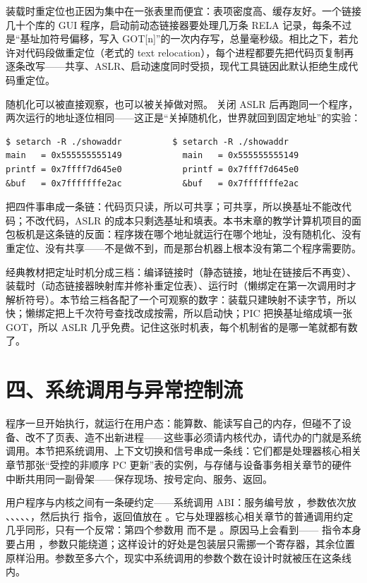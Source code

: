 装载时重定位也正因为集中在一张表里而便宜：表项密度高、缓存友好。一个链接几十个库的 GUI 程序，启动前动态链接器要处理几万条 RELA 记录，每条不过是“基址加符号偏移，写入 GOT[n]”的一次内存写，总量毫秒级。相比之下，若允许对代码段做重定位（老式的 text relocation），每个进程都要先把代码页复制再逐条改写——共享、ASLR、启动速度同时受损，现代工具链因此默认拒绝生成代码重定位。

随机化可以被直接观察，也可以被关掉做对照。 关闭 ASLR 后再跑同一个程序，两次运行的地址逐位相同——这正是“关掉随机化，世界就回到固定地址”的实验：

\begin{lstlisting}
$ setarch -R ./showaddr          $ setarch -R ./showaddr
main   = 0x555555555149            main   = 0x555555555149
printf = 0x7ffff7d645e0            printf = 0x7ffff7d645e0
&buf   = 0x7fffffffe2ac            &buf   = 0x7fffffffe2ac
\end{lstlisting}

把四件事串成一条链：代码页只读，所以可共享；可共享，所以换基址不能改代码；不改代码，ASLR 的成本只剩选基址和填表。本书末章的教学计算机项目的面包板机是这条链的反面：程序拨在哪个地址就运行在哪个地址，没有随机化、没有重定位、没有共享——不是做不到，而是那台机器上根本没有第二个程序需要防。

\begin{classicnote}
经典教材把定址时机分成三档：编译链接时（静态链接，地址在链接后不再变）、装载时（动态链接器映射库并修补重定位表）、运行时（懒绑定在第一次调用时才解析符号）。本节给三档各配了一个可观察的数字：装载只建映射不读字节，所以  快；懒绑定把上千次符号查找改成按需，所以启动快；PIC 把换基址缩成填一张 GOT，所以 ASLR 几乎免费。记住这张时机表，每个机制省的是哪一笔就都有数了。
\end{classicnote}

\section{四、系统调用与异常控制流}

程序一旦开始执行，就运行在用户态：能算数、能读写自己的内存，但碰不了设备、改不了页表、造不出新进程——这些事必须请内核代办，请代办的门就是系统调用。本节把系统调用、上下文切换和信号串成一条线：它们都是处理器核心相关章节那张“受控的非顺序 PC 更新”表的实例，与存储与设备事务相关章节的硬件中断共用同一副骨架——保存现场、按号定向、服务、返回。

用户程序与内核之间有一条硬约定——系统调用 ABI：服务编号放 ，参数依次放 、、、、、，然后执行  指令，返回值放在 。它与处理器核心相关章节的普通调用约定几乎同形，只有一个反常：第四个参数用  而不是 。原因马上会看到—— 指令本身要占用 ，参数只能绕道；这样设计的好处是包装层只需挪一个寄存器，其余位置原样沿用。参数至多六个，现实中系统调用的参数个数在设计时就被压在这条线内。

